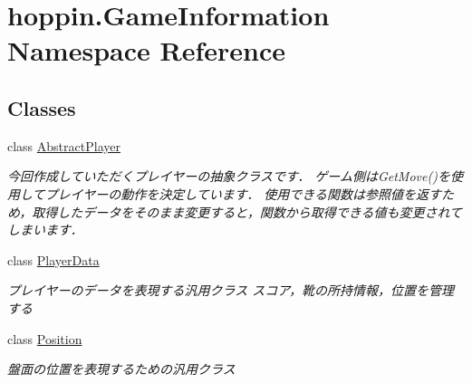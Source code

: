 \hypertarget{namespacehoppin_1_1_game_information}{}\section{hoppin.\+Game\+Information Namespace Reference}
\label{namespacehoppin_1_1_game_information}
\subsection*{Classes}
\begin{DoxyCompactItemize}
\item 
class \hyperlink{classhoppin_1_1_game_information_1_1_abstract_player}{Abstract\+Player}
\begin{DoxyCompactList}\small\item\em 今回作成していただくプレイヤーの抽象クラスです． ゲーム側は\+Get\+Move()を使用してプレイヤーの動作を決定しています． 使用できる関数は参照値を返すため，取得したデータをそのまま変更すると，関数から取得できる値も変更されてしまいます． \end{DoxyCompactList}\item 
class \hyperlink{classhoppin_1_1_game_information_1_1_player_data}{Player\+Data}
\begin{DoxyCompactList}\small\item\em プレイヤーのデータを表現する汎用クラス スコア，靴の所持情報，位置を管理する \end{DoxyCompactList}\item 
class \hyperlink{classhoppin_1_1_game_information_1_1_position}{Position}
\begin{DoxyCompactList}\small\item\em 盤面の位置を表現するための汎用クラス \end{DoxyCompactList}\end{DoxyCompactItemize}
